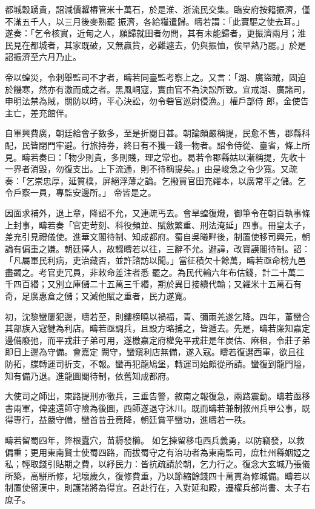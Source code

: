 \begin{pinyinscope}
 都城穀踴貴，詔減價糶樁管米十萬石，於是淮、浙流民交集。臨安府按籍振濟，僅不滿五千人，以三月後麥熟罷
 振濟，各給糧遣歸。疇若謂：「此實驅之使去耳。」遂奏：「乞令核實，近甸之人，願歸就田者勿問，其有未能歸者，更振濟兩月；淮民見在都城者，其家既破，又無贏貲，必難遽去，仍與振恤，俟早熟乃罷。」於是詔振濟至六月乃止。



 帝以蝗災，令刺舉監司不才者，疇若同臺監考察上之。又言：「湖、廣盜賊，固迫於饑寒，然亦有激而成之者。黑風峒寇，實由官不為決訟所致。宜戒湖、廣諸司，申明法禁為賊，關防以時，平心決訟，勿令砦官巡尉侵漁。」權戶部侍
 郎，金使告主亡，差充館伴。



 自軍興費廣，朝廷給會子數多，至是折閱日甚。朝論頗嚴稱提，民愈不售，郡縣科配，民皆閉門牢避。行旅持券，終日有不獲一錢一物者。詔令侍從、臺省，條上所見。疇若奏曰：「物少則貴，多則賤，理之常也。曷若令郡縣姑以漸稱提，先收十一界者消毀，勿復支出。上下流通，則不待稱提矣。」由是峻急之令少寬。又疏奏：「乞崇忠厚，延質樸，屏絕浮薄之論。乞撥買官田充糴本，以廣常平之儲。乞令戶察一員，專監安邊所。」
 帝皆是之。



 因面求補外，退上章，降詔不允，又連疏丐去。會旱蝗復熾，御筆令在朝百執事條上封事，疇若奏「官吏苛刻、科役頻並、賦斂繁重、刑法淹延」四事。冊皇太子，差充引見禮儀使。進華文閣待制、知成都府。蜀自吳曦畔後，制置使移司興元，朝論有偏重之嫌。朝廷擇人，故輟疇若以往，三辭不允。避諱，改寶謨閣待制。詔：「凡屬軍民利病，吏治藏否，並許諮訪以聞。」當征積欠十餘萬，疇若亟命榜九邑盡蠲之。考官吏冗員，非敕命差注者悉
 罷之。為民代輸六年布估錢，計二十萬二千四百緡；又別立庫儲二十五萬三千緡，期於異日接續代輸；又糴米十五萬石有奇，足廣惠倉之儲；又減他賦之重者，民力遂寬。



 初，沈黎蠻屢犯邊，疇若至，則鏤榜曉以禍福，青、彌兩羌遂乞降。四年，董蠻合其部族入寇犍為利店。疇若亟調兵，且設方略捕之，皆遁去。先是，疇若廉知嘉定邊備廢弛，而平戎莊子弟可用，遂檄嘉定府權免平戎莊是年炭估、麻租，令莊子弟即日上邊為守備。會嘉定
 闕守，蠻窺利店無備，遂入寇。疇若復選西軍，欲且往防拓，牒轉運司折支，不報。蠻再犯龍鳩堡，轉運司始頗從所請。蠻復到龍門隘，知有備乃退。進龍圖閣待制，依舊知成都府。



 大使司之師出，東路提刑亦徵兵，三垂告警，敘南之報復急，兩路震動。疇若亟移書兩軍，俾速還師守險為後圖，西師遂退守沐川。既而疇若兼制敘州兵甲公事，既得專行，益嚴守備，蠻首昔丑竟降，朝廷賞平蠻功，進疇若一秩。



 疇若留蜀四年，弊根蠹穴，苗耨發櫛。
 如乞揀留移屯西兵義勇，以防竊發，以救偏重；更用東南賢士使蜀四路，而拔蜀守之有治功者為東南監司，庶杜州縣姻婭之私；輕取錢引貼期之費，以紓民力：皆抗疏請於朝，乞力行之。復念大玄城乃張儀所築，高駢所修，圮壞歲久，復修費重，乃以節縮餘錢四十萬貫為修城備。疇若以制置使留漢中，則護諸將為得宜。召赴行在，入對延和殿，遷權兵部尚書、太子右庶子。




\end{pinyinscope}
